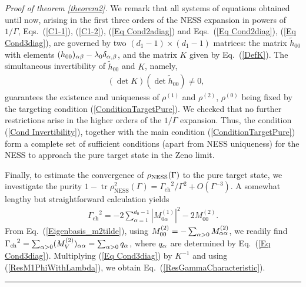\documentclass[aps,pra,letterpaper,twocolumn,showpacs,superscriptaddress,floatfix,longbibliography]{revtex4-1}
\newcommand{\tr}{\mathop{\mathrm{tr}}\limits}
\newenvironment{proof}[1][Proof]{\noindent\textit{#1.} }{\
  \rule{0.5em}{0.5em}}
\begin{document}
\begin{proof}[Proof of theorem \ref{theorem2}]
  We remark that all systems of equations obtained until now, arising
  in the first three orders of the NESS expansion in powers of
  $1/\Gamma$, Eqs.~(\ref{C1-1}), (\ref{C1-2}), (\ref{Eq Cond2adiag})
  and Eqs.~(\ref{Eq Cond2diag}), (\ref{Eq Cond3diag}), are governed by
  two $(d_1-1)\times (d_1-1)$ matrices: the matrix $\tilde h_{00}$
  with elements $(h_{00})_{\alpha\beta} - \lambda_0 \delta_{\alpha,\beta}$,
  and the matrix $K$ given by Eq.~(\ref{DefK}).  The simultaneous
  invertibility of $\tilde h_{00}$ and $K$, namely,
  \begin{align}
    & (\det K) (\det {\tilde h}_{00}) \neq 0, \label{Cond
      Invertibility}
  \end{align}
  guarantees the existence and uniqueness of $\rho^{(1)}$ and
  $\rho^{(2)}$, $\rho^{(0)}$ being fixed by the targeting condition
  (\ref{ConditionTargetPure}).  We checked that no further
  restrictions arise in the higher orders of the $1/\Gamma$ expansion.
  Thus, the condition (\ref{Cond Invertibility}), together with the
  main condition (\ref{ConditionTargetPure}) form a complete set of
  sufficient conditions (apart from NESS uniqueness) for the NESS to
  approach the pure target state in the Zeno limit.

  Finally, to estimate the convergence of $\rho_{\rm{NESS}}(\Gamma)$
  to the pure target state, we investigate the purity $1-
  \tr\rho^2_\mathrm{NESS}(\Gamma) = {\Gamma_\mathrm{ch}}^2/\Gamma^2+
  O(\Gamma^{-3})$.  A somewhat lengthy but straightforward calculation
  yields
  \begin{align}
    {\Gamma_\mathrm{ch}}^2 = -2 \sum_{\alpha=1}^{d_0-1} \left|
      M^{(1)}_{0\alpha} \right|^2 - 2 M^{(2)}_{00}.
    \label{PurenessCharacteristicGamma}
  \end{align}
  From Eq.~(\ref{Eigenbasis_m2tilde}), using $M^{(2)}_{00}=-
  \sum_{\alpha>0} M^{(2)}_{\alpha\alpha}$, we readily find
  ${\Gamma_\mathrm{ch}}^2 = \sum_{\alpha>0} (M^{(2)}_V)_{\alpha \alpha} =
  \sum_{\alpha>0} q_\alpha$, where $q_\alpha$ are determined by Eq.~(\ref{Eq
    Cond3diag}). Multiplying (\ref{Eq Cond3diag}) by $K^{-1}$ and
  using (\ref{ResM1PhiWithLambda}), we obtain
  Eq.~(\ref{ResGammaCharacteristic}).
\end{proof}


\end{document}
